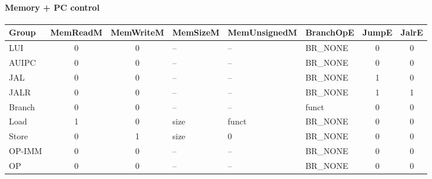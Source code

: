 \paragraph{Memory + PC control}
\begin{center}
\small
\begin{tabular}{@{}l c c l l l c c@{}}
\toprule
Group & MemReadM & MemWriteM & MemSizeM & MemUnsignedM & BranchOpE & JumpE & JalrE \\
\midrule
LUI    & 0 & 0 & --   & --    & BR\_NONE & 0 & 0 \\
AUIPC  & 0 & 0 & --   & --    & BR\_NONE & 0 & 0 \\
JAL    & 0 & 0 & --   & --    & BR\_NONE & 1 & 0 \\
JALR   & 0 & 0 & --   & --    & BR\_NONE & 1 & 1 \\
Branch & 0 & 0 & --   & --    & funct    & 0 & 0 \\
Load   & 1 & 0 & size & funct & BR\_NONE & 0 & 0 \\
Store  & 0 & 1 & size & 0     & BR\_NONE & 0 & 0 \\
OP-IMM & 0 & 0 & --   & --    & BR\_NONE & 0 & 0 \\
OP     & 0 & 0 & --   & --    & BR\_NONE & 0 & 0 \\
\bottomrule
\end{tabular}
\end{center}
\normalsize
